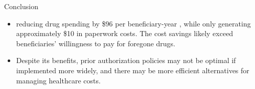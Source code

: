 \begin{frame}{Conclusion}
    \begin{itemize}
        \item reducing drug spending by \$96 per beneficiary-year , while only generating approximately \$10 in paperwork costs. The cost savings likely exceed beneficiaries’ willingness to pay for foregone drugs.

        \item Despite its benefits, prior authorization policies may not be optimal if implemented more widely, and there may be more efficient alternatives for managing healthcare costs.
    \end{itemize}
\end{frame}